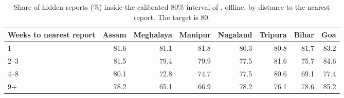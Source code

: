 \begin{table}[tbp]
\caption{Share of hidden reports (\%) inside the calibrated 80\% interval of \auto{}, offline, by distance to the nearest report. The target is 80.}
\label{tab:calib}
\small
\begin{tabular}{lrrrrrrr}
\toprule
Weeks to nearest report & Assam & Meghalaya & Manipur & Nagaland & Tripura & Bihar & Goa \\
\midrule
1 & 81.6 & 81.1 & 81.8 & 80.3 & 80.8 & 81.7 & 83.2 \\
2--3 & 81.5 & 79.4 & 79.9 & 77.5 & 81.6 & 75.7 & 84.6 \\
4--8 & 80.1 & 72.8 & 74.7 & 77.5 & 80.6 & 69.1 & 77.4 \\
9+ & 78.2 & 65.1 & 66.9 & 78.2 & 76.1 & 78.6 & 85.2 \\
\bottomrule
\end{tabular}
\end{table}
